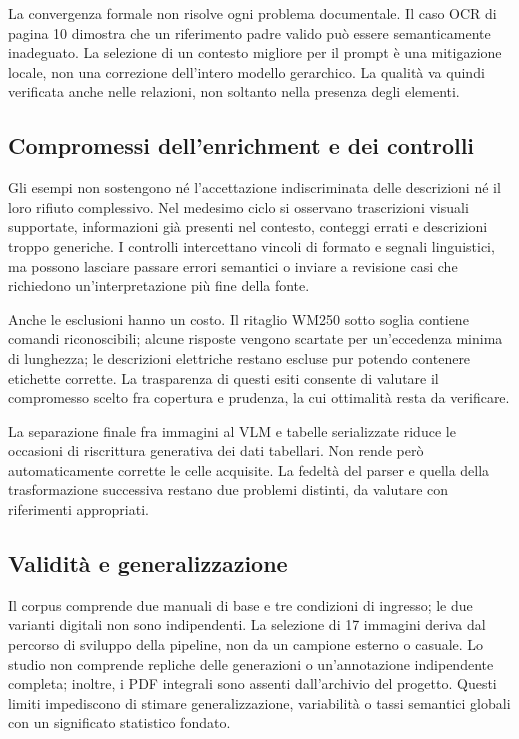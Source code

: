 La convergenza formale non risolve ogni problema documentale. Il caso OCR di pagina 10 dimostra che un riferimento padre valido può essere semanticamente inadeguato. La selezione di un contesto migliore per il prompt è una mitigazione locale, non una correzione dell'intero modello gerarchico. La qualità va quindi verificata anche nelle relazioni, non soltanto nella presenza degli elementi.

\subsection{Compromessi dell'enrichment e dei controlli}

Gli esempi non sostengono né l'accettazione indiscriminata delle descrizioni né il loro rifiuto complessivo. Nel medesimo ciclo si osservano trascrizioni visuali supportate, informazioni già presenti nel contesto, conteggi errati e descrizioni troppo generiche. I controlli intercettano vincoli di formato e segnali linguistici, ma possono lasciare passare errori semantici o inviare a revisione casi che richiedono un'interpretazione più fine della fonte.

Anche le esclusioni hanno un costo. Il ritaglio WM250 sotto soglia contiene comandi riconoscibili; alcune risposte vengono scartate per un'eccedenza minima di lunghezza; le descrizioni elettriche restano escluse pur potendo contenere etichette corrette. La trasparenza di questi esiti consente di valutare il compromesso scelto fra copertura e prudenza, la cui ottimalità resta da verificare.

La separazione finale fra immagini al VLM e tabelle serializzate riduce le occasioni di riscrittura generativa dei dati tabellari. Non rende però automaticamente corrette le celle acquisite. La fedeltà del parser e quella della trasformazione successiva restano due problemi distinti, da valutare con riferimenti appropriati.

\subsection{Validità e generalizzazione}

Il corpus comprende due manuali di base e tre condizioni di ingresso; le due varianti digitali non sono indipendenti. La selezione di 17 immagini deriva dal percorso di sviluppo della pipeline, non da un campione esterno o casuale. Lo studio non comprende repliche delle generazioni o un'annotazione indipendente completa; inoltre, i PDF integrali sono assenti dall'archivio del progetto. Questi limiti impediscono di stimare generalizzazione, variabilità o tassi semantici globali con un significato statistico fondato.

